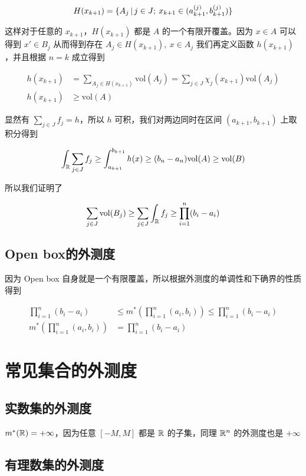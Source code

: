 \[
H(x_{k+1}) = \{ A_j \,\vert\, j \in J;\: x_{k+1} \in (a_{k+1}^{(j)}, b_{k+1}^{(j)}) \}
\]

这样对于任意的 $x_{k+1}$，$H(x_{k+1})$ 都是 $A$ 的一个有限开覆盖。因为 $x \in A$ 可以得到 $x' \in B_j$ 从而得到存在 $A_j \in H(x_{k+1}), \: x \in A_j$
我们再定义函数 $h(x_{k+1})$，并且根据 $n=k$ 成立得到

\begin{align*}
h(x_{k+1}) &= \sum_{A_j \in H(x_{k+1})} \mathrm{vol}(A_j) = \sum_{j \in J}\chi_{j}(x_{k+1}) \mathrm{vol}(A_j) \\
h(x_{k+1}) & \ge \mathrm{vol}(A) 
\end{align*}

 
显然有 $\sum_{j \in J}f_j = h$，所以 $h$ 可积，我们对两边同时在区间 $(a_{k+1}, b_{k+1})$ 上取积分得到


\[
 \int_{\mathbb{R}}\sum_{j \in J}f_j \ge \int_{a_{k+1}}^{b_{k+1}}h(x) \ge (b_n - a_n)\mathrm{vol}(A) \ge \mathrm{vol}(B)
\]


所以我们证明了

\[
    \sum_{j \in J}\mathrm{vol}(B_j) \ge \sum_{j \in J}\int_{\mathbb{R}}f_j \ge \prod_{i=1}^{n}(b_i - a_i)
\]

\subsection{Open box的外测度}

因为 Open box 自身就是一个有限覆盖，所以根据外测度的单调性和下确界的性质得到

\begin{align*}
 \prod_{i=1}^{n}(b_i - a_i) & \le m^*(\prod_{i=1}^{n}(a_i, b_i)) \le \prod_{i=1}^{n}(b_i - a_i) \\
m^*(\prod_{i=1}^{n}(a_i, b_i)) & = \prod_{i=1}^{n}(b_i - a_i)
\end{align*}

\section{常见集合的外测度}

\subsection{实数集的外测度}

$m^*(\mathbb{R}) = +\infty$，因为任意 $[-M, M]$ 都是 $\mathbb{R}$ 的子集，同理 $\mathbb{R}^n$ 的外测度也是 $+\infty$

\subsection{有理数集的外测度}

